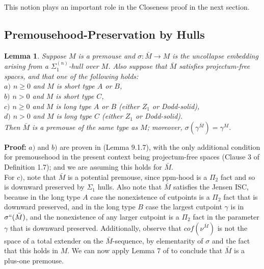 \documentclass[12pt]{article}
\newtheorem{lem}[thm]{Lemma}
\begin{document}
This notion plays an important role in the Closeness proof in the next section.






\subsection{Premousehood-Preservation by Hulls}



\begin{lem} \label{downward mouse-pres}
Suppose $M$ is a premouse and $\sigma: \bar{M} \longrightarrow M$ is the uncollapse embedding arising from a $\Sigma_1^{(n)}$-hull over $M$.  Also suppose that $\bar{M}$ satisfies projectum-free spaces, and that one of the following holds:\\

\indent $a)$ $n \geq 0$ and $M$ is short type $A$ or $B$,\\

\indent $b)$ $n > 0$ and $M$ is short type $C$,\\

\indent $c)$ $n \geq 0$ and $M$ is long type $A$ or $B$ (either $Z_1$ or Dodd-solid),\\

\indent $d)$ $n > 0$ and $M$ is long type $C$ (either $Z_1$ or Dodd-solid).\\


Then $\bar{M}$ is a premouse of the same type as $M$; moreover, $\sigma ( \gamma^{\bar{M}}) = \gamma^M$.\\
\end{lem}

\textbf{Proof:}  $a)$ and $b)$ are proven in \cite{zeman book} (Lemma 9.1.7), with the only additional condition for premousehood in the present context being projectum-free spaces (Clause 3 of Definition 1.7); and we are assuming this holds for $\bar{M}$.\\

For $c)$, note that $\bar{M}$ is a potential premouse, since ppm-hood is a $\Pi_2$ fact and so is downward preserved by $\Sigma_1$ hulls.  Also note that $\bar{M}$ satisfies the Jensen ISC, because in the long type $A$ case the nonexistence of cutpoints is a $\Pi_2$ fact that is downward preserved, and in the long type $B$ case the largest cutpoint $\gamma$ is in $\sigma `` (\bar{M})$, and the nonexistence of any larger cutpoint is a $\Pi_2$ fact in the parameter $\gamma$ that is downward preserved.  Additionally, observe that $cof(\nu^{\bar{M}})$ is not the space of a total extender on the $\bar{M}$-sequence, by elementarity of $\sigma$ and the fact that this holds in $M$.  We can now apply Lemma 7 of \cite{PIPM} to conclude that $\bar{M}$ is a plus-one premouse.\\
\end{document}
